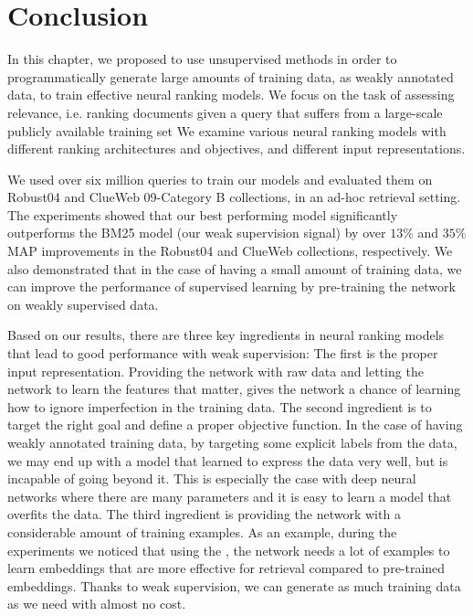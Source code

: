 \section{Conclusion}
In this chapter, we proposed to use unsupervised methods in order to programmatically generate large amounts of training data, as weakly annotated data, to train effective neural ranking models.
We focus on the task of assessing relevance, i.e. ranking documents given a query that suffers from a large-scale publicly available training set
We examine various neural ranking models with different ranking architectures and objectives, and different input representations. 

We used over six million queries to train our models and evaluated them on Robust04 and ClueWeb 09-Category B collections, in an ad-hoc retrieval setting.  The experiments showed that our best performing model significantly outperforms the BM25 model (our weak supervision signal) by over $13\%$ and $35\%$ MAP improvements in the Robust04 and ClueWeb collections, respectively. 
We also demonstrated that in the case of having a small amount of training data, we can improve the performance of supervised learning by pre-training the network on weakly supervised data.

Based on our results, there are three key ingredients in neural ranking models that lead to good performance with weak supervision:
%
The first is the proper input representation. Providing the network with raw data and letting the network to learn the features that matter, gives the network a chance of learning how to ignore imperfection in the training data.
%
The second ingredient is to target the right goal and define a proper objective function. In the case of having weakly annotated training data, by targeting some explicit labels from the data, we may end up with a model that learned to express the data very well, but is incapable of going beyond it. 
This is especially the case with deep neural networks where there are many parameters and it is easy to learn a model that overfits the data.
%
The third ingredient is providing the network with a considerable amount of training examples. 
As an example, during the experiments we noticed that using the \feedthree, the network needs a lot of examples to learn embeddings that are more effective for retrieval compared to pre-trained embeddings. 
Thanks to weak supervision, we can generate as much training data as we need with almost no cost.


